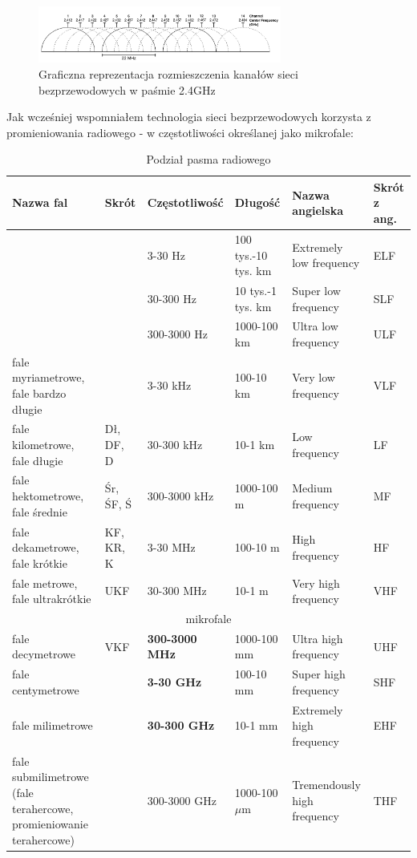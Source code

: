 \begin{figure}[h!]
  \centering
    \includegraphics[width=8cm]{images/wifi_channels}
  \caption{Graficzna reprezentacja rozmieszczenia kanałów sieci bezprzewodowych w paśmie 2.4GHz}
  \label{fig:wifiChannels}
\end{figure}

Jak wcześniej wspomniałem technologia sieci bezprzewodowych korzysta z promieniowania radiowego - w częstotliwości określanej jako mikrofale:\cite{FaleRadioweWiki}

\begin{table}
\caption{Podział pasma radiowego}
\label{table:radio}
\begin{tabular}{ |p{3cm}|p{1cm}|p{2cm}|p{2cm}|p{2.5cm}|p{1.5cm}|  }
 \hline
Nazwa fal	& Skrót	& Częstotliwość	& Długość	& Nazwa angielska	& Skrót z ang. \\
\hline
\hline
& & 3-30 Hz   & 100 tys.-10 tys. km	& Extremely low frequency	& ELF\\
\hline
& & 30-300 Hz & 10 tys.-1 tys. km	& Super low frequency	    & SLF\\
 \hline
& & 300-3000 Hz & 1000-100 km       & Ultra low frequency	    & ULF\\
 \hline
fale myriametrowe, fale bardzo długie & &	3-30 kHz & 100-10 km & Very low frequency  & VLF\\
\hline
fale kilometrowe, fale długie	& Dł, DF, D & 30-300 kHz & 10-1 km & Low frequency     & LF\\
\hline
fale hektometrowe, fale średnie & Śr, ŚF, Ś & 300-3000 kHz & 1000-100 m  & Medium frequency & MF\\
\hline
fale dekametrowe, fale krótkie  & KF, KR, K	& 3-30 MHz     & 100-10 m    & High frequency           & HF\\
\hline
fale metrowe, fale ultrakrótkie	& UKF	    & 30-300 MHz   & 10-1 m      & Very high frequency      & VHF\\
\hline
\multicolumn{6}{|c|}{mikrofale} \\
\hline
fale decymetrowe	            & VKF       & \textbf{300-3000 MHz} & 1000-100 mm & Ultra high frequency	    & UHF\\
\hline
fale centymetrowe		        &           & \textbf{3-30 GHz}	   & 100-10 mm	 & Super high frequency	    & SHF\\
\hline
fale milimetrowe		        &           & \textbf{30-300 GHz}   & 10-1 mm	 & Extremely high frequency	& EHF\\
\hline
fale submilimetrowe (fale terahercowe, promieniowanie terahercowe) & & 300-3000 GHz & 1000-100 $\mu$m & Tremendously high frequency & THF\\
 \hline
\end{tabular}
\end{table}

